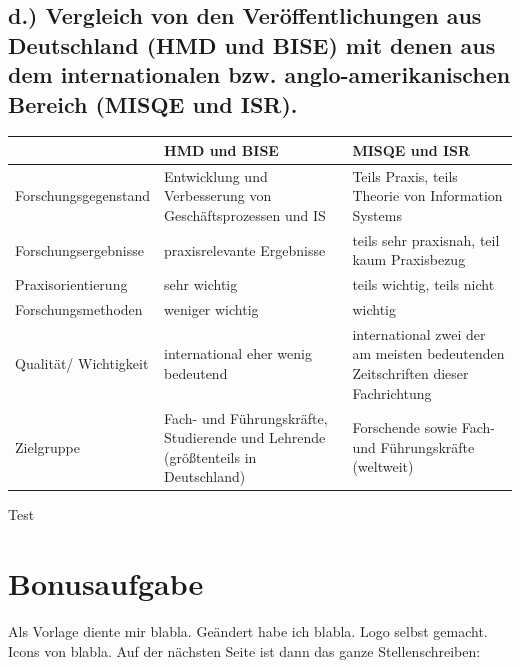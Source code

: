\documentclass[12pt,utf8]{scrartcl}
\begin{document}
\begin{flushleft}
\subsection{\label{sub4:einfuehrung}d.) Vergleich von den Veröffentlichungen aus Deutschland (HMD und BISE) mit denen aus dem internationalen bzw. anglo-amerikanischen Bereich (MISQE und ISR).}

\begin{tabular}{|p{4cm}|p{5.5cm}|p{5.5cm}|}
\hline
& HMD und BISE & MISQE und ISR \\
\hline
Forschungsgegenstand & Entwicklung und Verbesserung von Geschäftsprozessen und IS & Teils Praxis, teils Theorie von Information Systems \\
\hline
Forschungsergebnisse & praxisrelevante Ergebnisse & teils sehr praxisnah, teil kaum Praxisbezug \\
\hline
Praxisorientierung & sehr wichtig & teils wichtig, teils nicht \\
\hline
Forschungsmethoden & weniger wichtig & wichtig \\
\hline
Qualität/ Wichtigkeit & international eher wenig bedeutend & international zwei der am meisten bedeutenden Zeitschriften dieser Fachrichtung \\
\hline
Zielgruppe & Fach- und Führungskräfte, Studierende und Lehrende (größtenteils in Deutschland) & Forschende sowie Fach- und Führungskräfte (weltweit) \\
\hline
\end{tabular}
\newline
\newline
\newline

Test

\section{\label{sec:bonus}Bonusaufgabe}

Als Vorlage diente mir \cite{online1}  blabla. Geändert habe ich blabla. Logo selbst gemacht.
Icons von blabla\cite{online2}. Auf der nächsten Seite ist dann das ganze Stellenschreiben:


\end{flushleft}
\end{document}
